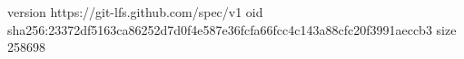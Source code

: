 version https://git-lfs.github.com/spec/v1
oid sha256:23372df5163ca86252d7d0f4e587e36fcfa66fcc4c143a88cfc20f3991aeccb3
size 258698
